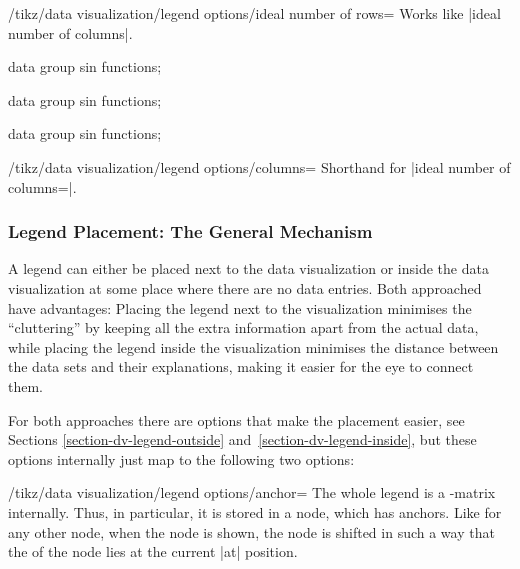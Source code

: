 \begin{key}{/tikz/data visualization/legend options/ideal number of rows=}
  Works like |ideal number of columns|.
\begin{codeexample}[width=7cm]
\tikz \datavisualization [
  visualize as smooth line/.list={1,2,3,4,5,6,7,8},
  legend example, style sheet=vary hue,
  main legend={ideal number of rows=2}]
data group {sin functions};
\end{codeexample}  
\begin{codeexample}[width=7cm]
\tikz \datavisualization [
  visualize as smooth line/.list={1,2,3,4,5,6,7,8},
  legend example, style sheet=vary hue,
  main legend={ideal number of rows=4}]
data group {sin functions};
\end{codeexample}  
\begin{codeexample}[width=7cm]
\tikz \datavisualization [
  visualize as smooth line/.list={1,2,3,4,5,6,7,8},
  legend example, style sheet=vary hue,
  main legend={max columns=3,ideal number of rows=2}]
data group {sin functions};
\end{codeexample}  
\end{key}

\begin{key}{/tikz/data visualization/legend
    options/columns=}
  Shorthand for |ideal number of columns=|.
\end{key}


\subsubsection{Legend Placement: The General Mechanism}

A legend can either be placed next to the data visualization or inside
the data visualization at some place where there are no data
entries. Both approached have advantages: Placing the legend next to
the visualization minimises the ``cluttering'' by keeping all the
extra information apart from the actual data, while placing the legend
inside the visualization minimises the distance between the data sets
and their explanations, making it easier for the eye to connect them.

For both approaches there are options that make the placement easier,
see Sections \ref{section-dv-legend-outside}
and~\ref{section-dv-legend-inside}, but these options internally just
map to the following two options:

\begin{key}{/tikz/data visualization/legend
    options/anchor=}
  The whole legend is a \tikzname-matrix internally. Thus,
  in particular, it is stored in a node, which has anchors. Like for
  any other node, when the node is shown, the node is shifted in such
  a way that the  of the node lies at the current |at|
  position. 
\end{key}


